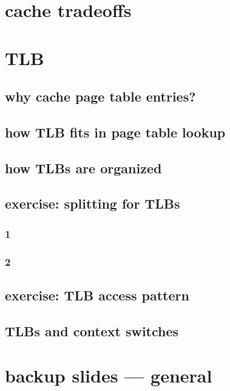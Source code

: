 \section{cache tradeoffs}


\section{TLB}
\subsection{why cache page table entries?}


\subsection{how TLB fits in page table lookup}


\subsection{how TLBs are organized}

\subsection{exercise: splitting for TLBs}
\subsubsection{1}

\subsubsection{2}



\subsection{exercise: TLB access pattern}




\subsection{TLBs and context switches}


\section{backup slides --- general}

